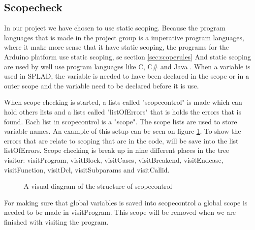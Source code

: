 \subsection{Scopecheck}
\label{sec:scopecheck}
In our project we have chosen to use static scoping. Because the program languages that is made in the project group is a imperative program languages, where it make more sense that it have static scoping, the programs for the Arduino platform use static scoping, se section \ref{sec:scoperules}
And static scoping are used by well use program languages like C, C\# and Java \citep{ProgrammingCommunityIndex}.
When a variable is used in SPLAD, the variable is needed to have been declared in the scope or in a outer scope and the variable need to be declared before it is use.

When scope checking is started, a lists called "scopecontrol" is made which can hold others lists and a lists called "listOfErrors" that is holds the errors that is found. Each list in scopecontrol is a "scope". The scope lists are used to store variable names. An example of this setup can be seen on figure \ref{fig:scopediagram}. To show the errors that are relate to scoping that are in the code, will be save into the list listOfErrors. Scope checking is break up in nine different places in the tree visitor: visitProgram, visitBlock, visitCases, visitBreakend, visitEndcase, visitFunction, visitDcl, visitSubparams and visitCallid.

\begin{figure}[H]

\centering
{}
\caption{A visual diagram of the structure of scopecontrol}
\label{fig:scopediagram}
\end{figure}

For making sure that global variables is saved into scopecontrol a global scope is needed to be made in visitProgram. This scope will be removed when we are finished with visiting the program.

